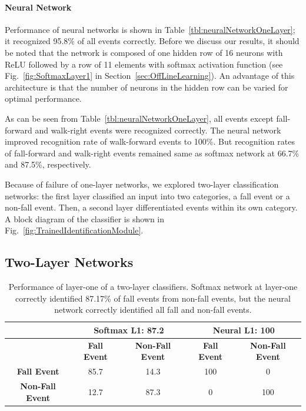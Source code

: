 \documentclass[]{IEEEtran}
\begin{document}
\paragraph{Neural Network}
\label{sec:NeuralNetwork2}
Performance of neural networks is shown in Table~\ref{tbl:neuralNetworkOneLayer}; it recognized 95.8\% of all events correctly. Before we discuss our results, it should be noted that the network is composed of one hidden row of  16 neurons with ReLU followed by a row of 11 elements with softmax activation function (see Fig.~\ref{fig:SoftmaxLayer1} in Section~\ref{sec:OffLineLearning}). An advantage of this architecture is that the number of neurons in the hidden row  can be varied for optimal performance.

\par
As can be seen from Table~\ref{tbl:neuralNetworkOneLayer}, all events except fall-forward and walk-right events were recognized correctly. The neural network improved recognition rate of walk-forward events to 100\%. But recognition rates of 
fall-forward and walk-right events remained same as softmax network at 66.7\% and 87.5\%, respectively.
\par
Because of failure of one-layer networks, we explored two-layer classification networks: the first layer classified an input into two categories, a fall event or a non-fall event. Then, a second layer  differentiated events within its own category. A block diagram of the classifier  is shown in Fig.~\ref{fig:TrainedIdentificationModule}.
\subsection{Two-Layer Networks}
\label{sec:TwoLayerNetworks}
\begin{table}[htb]
\caption{ Performance of layer-one of a two-layer classifiers. Softmax network at layer-one correctly identified 87.17\% of fall events from non-fall events, but the neural network correctly identified all fall and non-fall events.}
\label{tbl:layer1RecognitionRates}
\resizebox{\columnwidth}{!}
{
\begin{tabular}{|c|c|c||c|c|}
\hline
& \multicolumn{2}{c||}{\bf Softmax L1: 87.2} & \multicolumn{2}{c|}{\bf Neural L1: 
100} \\ \hline
& \textbf{Fall Event} & \textbf{Non-Fall Event}  & \textbf{Fall Event} & \textbf{Non-Fall 
Event} \\ \hline
\textbf{Fall Event} & 85.7 &  14.3  & 100 &  0 \\ \hline
\textbf{Non-Fall Event} & 12.7 &  87.3 & 0 &  100 \\ \hline
\end{tabular}
}
\end{table}
\end{document}
